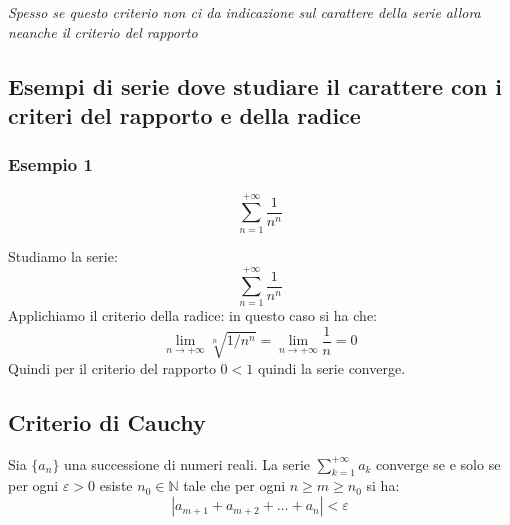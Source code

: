     \emph{Spesso se questo criterio non ci da indicazione sul carattere della serie allora neanche il criterio del rapporto}
\subsection{Esempi di serie dove studiare il carattere con i criteri del rapporto e della radice}
    \subsubsection{Esempio 1}
    \[ \sum_{n=1}^{+\infty} \frac{1}{n^n} \]
    \begin{esempio}
        Studiamo la serie:
            \[ \sum_{n=1}^{+\infty} \frac{1}{n^n} \]
        Applichiamo il criterio della radice:
        in questo caso si ha che:
        \begin{equation} \lim_{n \to +\infty} \sqrt[n]{1/n^n} = \lim_{n \to +\infty} \frac{1}{n} = 0
        \end{equation}
        Quindi per il criterio del rapporto $0<1$ quindi la serie converge.
            \end{esempio}
    \subsection{Criterio di Cauchy}
    Sia $\{a_n\}$ una successione di numeri reali. La serie $\sum_{k=1}^{+\infty} a_k$ converge se e solo se per ogni $\varepsilon > 0$ esiste $n_0 \in \mathbb{N}$ tale che per ogni $n \geq m \geq n_0$ si ha:
    \[ |a_{m+1} + a_{m+2} + \ldots + a_n| < \varepsilon \]